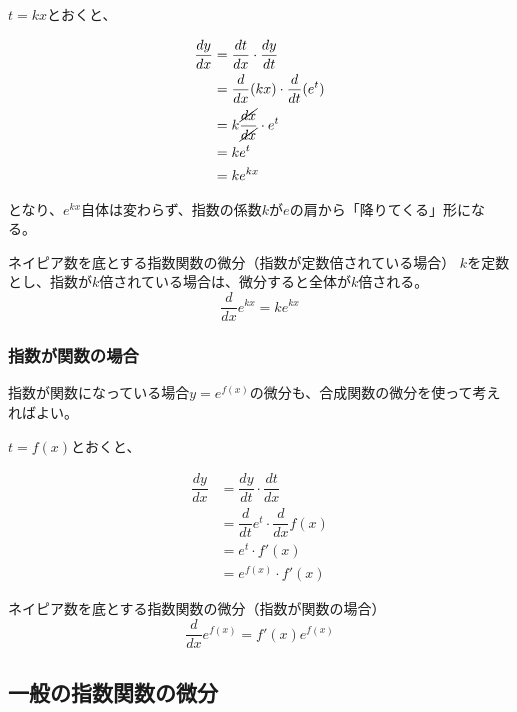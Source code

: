 \documentclass[../math-imaging]{subfiles}
\begin{document}
$t=kx$とおくと、

\begin{align}
  \dfrac{dy}{dx} & = \dfrac{dt}{dx} \cdot \dfrac{dy}{dt}          \\
                 & = \dfrac{d}{dx} (kx) \cdot \dfrac{d}{dt} (e^t) \\
                 & = k\dfrac{\cancel{dx}}{\cancel{dx}} \cdot e^t  \\
                 & = ke^{t}                                       \\
                 & = ke^{kx}
\end{align}

となり、$e^{kx}$自体は変わらず、指数の係数$k$が$e$の肩から「降りてくる」形になる。

\begin{theorem}{ネイピア数を底とする指数関数の微分（指数が定数倍されている場合）}
  \newline
  $k$を定数とし、指数が$k$倍されている場合は、微分すると全体が$k$倍される。
  \LARGE
  \begin{equation}
    \dfrac{d}{dx}e^{kx} = ke^{kx}
  \end{equation}
\end{theorem}

\subsubsection{指数が関数の場合}

指数が関数になっている場合$y=e^{f(x)}$の微分も、合成関数の微分を使って考えればよい。

$t=f(x)$とおくと、

\begin{align}
  \dfrac{dy}{dx} & = \dfrac{dy}{dt} \cdot \dfrac{dt}{dx}      \\
                 & = \dfrac{d}{dt}e^t \cdot \dfrac{d}{dx}f(x) \\
                 & = e^t \cdot f'(x)                          \\
                 & = e^{f(x)} \cdot f'(x)
\end{align}

\begin{theorem}{ネイピア数を底とする指数関数の微分（指数が関数の場合）}
  \LARGE
  \begin{equation}
    \dfrac{d}{dx}e^{f(x)} = f'(x)e^{f(x)}
  \end{equation}
\end{theorem}

\subsection{一般の指数関数の微分}
\end{document}
